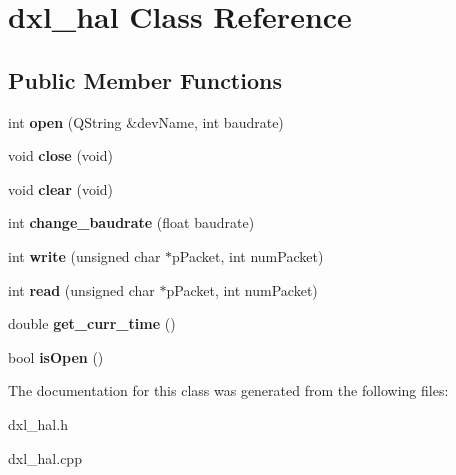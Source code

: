 \hypertarget{classdxl__hal}{}\section{dxl\+\_\+hal Class Reference}
\label{classdxl__hal}
\subsection*{Public Member Functions}
\begin{DoxyCompactItemize}
\item 
\hypertarget{classdxl__hal_a5b91f0f0b4a61fa113f9919e07e5a329}{}int {\bfseries open} (Q\+String \&dev\+Name, int baudrate)\label{classdxl__hal_a5b91f0f0b4a61fa113f9919e07e5a329}

\item 
\hypertarget{classdxl__hal_a250fd7e4acabf54d0733551a13e89a2d}{}void {\bfseries close} (void)\label{classdxl__hal_a250fd7e4acabf54d0733551a13e89a2d}

\item 
\hypertarget{classdxl__hal_a004eedde5af69219d7288ec8ea97c89f}{}void {\bfseries clear} (void)\label{classdxl__hal_a004eedde5af69219d7288ec8ea97c89f}

\item 
\hypertarget{classdxl__hal_a0eaaa5340bc9dce73cc920dc8befe5b0}{}int {\bfseries change\+\_\+baudrate} (float baudrate)\label{classdxl__hal_a0eaaa5340bc9dce73cc920dc8befe5b0}

\item 
\hypertarget{classdxl__hal_a90106970438fb0ab65852730a1c0776a}{}int {\bfseries write} (unsigned char $\ast$p\+Packet, int num\+Packet)\label{classdxl__hal_a90106970438fb0ab65852730a1c0776a}

\item 
\hypertarget{classdxl__hal_ac36331febb2eaa66303af3483795742a}{}int {\bfseries read} (unsigned char $\ast$p\+Packet, int num\+Packet)\label{classdxl__hal_ac36331febb2eaa66303af3483795742a}

\item 
\hypertarget{classdxl__hal_a6b6b7381c45308662fc3df6e7f74bc61}{}double {\bfseries get\+\_\+curr\+\_\+time} ()\label{classdxl__hal_a6b6b7381c45308662fc3df6e7f74bc61}

\item 
\hypertarget{classdxl__hal_a88bba601b5c9f285fcdc14e18a1f3398}{}bool {\bfseries is\+Open} ()\label{classdxl__hal_a88bba601b5c9f285fcdc14e18a1f3398}

\end{DoxyCompactItemize}


The documentation for this class was generated from the following files\+:\begin{DoxyCompactItemize}
\item 
dxl\+\_\+hal.\+h\item 
dxl\+\_\+hal.\+cpp\end{DoxyCompactItemize}
